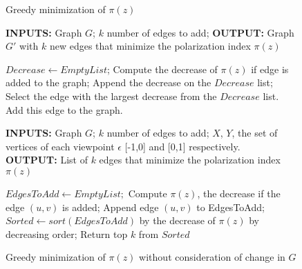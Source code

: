\begin{figure}
  \begin{minipage}[b]{1\linewidth}
    \begin{algorithm}[H]
	\caption{Greedy minimization of $\pi(z)$}
	\label{alg:greedyAlgo}
	\begin{flushleft}
        		\textbf{INPUTS:} Graph $G$; $k$ number of edges to add;
		\vspace{6pt}
        		\textbf{OUTPUT:} Graph $G'$ with $k$ new edges that minimize the polarization index $\pi(z)$
	\end{flushleft}
	\begin{algorithmic}[1]
		\FOR {$i = 1:k \ $}
		\STATE$Decrease \leftarrow Empty List$;
			\FOR { each  edge in $|V| \times |V| \textbackslash E$}
				\STATE Compute the decrease of $\pi(z)$ if edge is added to the graph;
				\STATE Append the decrease on the $Decrease$ list;
			\ENDFOR
		\STATE Select the edge with the largest decrease from the $Decrease$ list.
		\STATE Add this edge to the graph.
		\ENDFOR
	\end{algorithmic}
\end{algorithm}
\bigskip
  \end{minipage}
  \begin{minipage}[b]{1\linewidth}
     \begin{algorithm}[H]
	\caption{Greedy minimization of $\pi(z)$ without consideration of change in $G$}
	\label{alg:greedyWithout}
	\begin{flushleft}
        		\textbf{INPUTS:} Graph $G$; $k$ number of edges to add;
		$X$, $Y $, the set of vertices of each viewpoint $\epsilon$ [-1,0] and [0,1] respectively.\\
		\vspace{6pt}
        		\textbf{OUTPUT:} List of $k$ edges that minimize the polarization index $\pi(z)$
	\end{flushleft}
	\begin{algorithmic}[1]
		\STATE $EdgesToAdd \leftarrow Empty List;$
		\STATE Compute $\pi(z)$, the decrease if the edge $(u,v)$ is added;
		\STATE Append edge $(u,v)$ to EdgesToAdd;
		\ENDFOR
				\STATE $Sorted \leftarrow sort(EdgesToAdd)$ by the decrease of $\pi(z)$ by decreasing order;
		\STATE Return top $k$ from $Sorted$
	\end{algorithmic}
\end{algorithm}

  \end{minipage}%
\end{figure}
\vspace{10pt}


